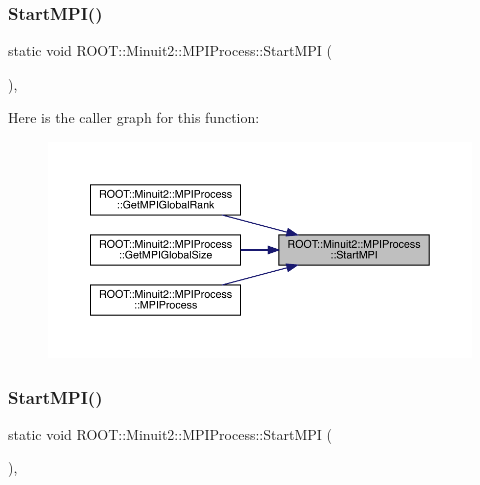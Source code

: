 \subsubsection{\texorpdfstring{StartMPI()}{StartMPI()}\hspace{0.1cm}{\footnotesize\ttfamily [1/3]}}
{\footnotesize\ttfamily static void R\+O\+O\+T\+::\+Minuit2\+::\+M\+P\+I\+Process\+::\+Start\+M\+PI (\begin{DoxyParamCaption}{ }\end{DoxyParamCaption})\hspace{0.3cm}{\ttfamily [inline]}, {\ttfamily [static]}}

Here is the caller graph for this function\+:
\nopagebreak
\begin{figure}[H]
\begin{center}
\leavevmode
\includegraphics[width=350pt]{dc/d43/classROOT_1_1Minuit2_1_1MPIProcess_a235146d3dbd688de458e09425e546d96_icgraph}
\end{center}
\end{figure}
\mbox{\label{classROOT_1_1Minuit2_1_1MPIProcess_a235146d3dbd688de458e09425e546d96}} 
\subsubsection{\texorpdfstring{StartMPI()}{StartMPI()}\hspace{0.1cm}{\footnotesize\ttfamily [2/3]}}
{\footnotesize\ttfamily static void R\+O\+O\+T\+::\+Minuit2\+::\+M\+P\+I\+Process\+::\+Start\+M\+PI (\begin{DoxyParamCaption}{ }\end{DoxyParamCaption})\hspace{0.3cm}{\ttfamily [inline]}, {\ttfamily [static]}}

